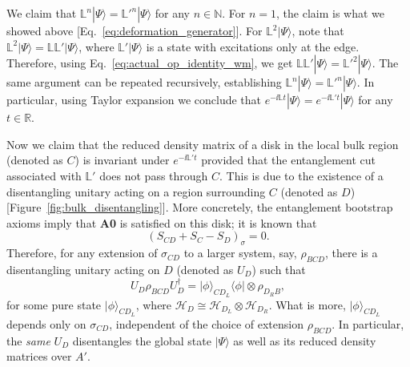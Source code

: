 \documentclass[12pt, nofootinbib]{article}
\theoremstyle{plain}
\theoremstyle{assumption}
\theoremstyle{definition}
\theoremstyle{plain}
\theoremstyle{plain}
\theoremstyle{plain}
\theoremstyle{plain}
\theoremstyle{plain}
\begin{document}
We claim that $\mathbb{L}^n|\Psi\rangle = {\mathbb{L}'}^{n}|\Psi\rangle$ for any $n\in \mathbb{N}$. For $n=1$, the claim is what we showed above  [Eq.~\eqref{eq:deformation_generator}]. For $\mathbb{L}^2 |\Psi\rangle$, note that $\mathbb{L}^2|\Psi\rangle = \mathbb{L} \mathbb{L}'|\Psi\rangle$, where $\mathbb{L}'|\Psi\rangle$ is a state with excitations only at the edge. Therefore, using Eq.~\eqref{eq:actual_op_identity_wm}, we get $\mathbb{L}\mathbb{L}' |\Psi\rangle = {\mathbb{L}'}^2|\Psi\rangle$. The same argument can be repeated recursively, establishing $\mathbb{L}^n|\Psi\rangle = {\mathbb{L}'}^n|\Psi\rangle$. In particular, using Taylor expansion we conclude that $e^{-\ii \mathbb{L} t} |\Psi\rangle = e^{-\ii \mathbb{L}' t} |\Psi\rangle$ for any $t\in \mathbb{R}$. 

Now we claim that the reduced density matrix of a disk in the local bulk region (denoted as $C$) is invariant under $e^{-\ii\mathbb{L}'t}$ provided that the entanglement cut associated with $\mathbb{L}'$ does not pass through $C$. This is due to the existence of a disentangling unitary acting on a region surrounding $C$ (denoted as $D$) [Figure~\ref{fig:bulk_disentangling}]. More concretely, the entanglement bootstrap axioms imply that \textbf{A0} is satisfied on this disk; it is known that~\cite{shi2020fusion}
\begin{equation}
    \left(S_{CD} + S_C - S_D \right)_{\sigma}=0.
\end{equation}
Therefore, for any extension of $\sigma_{CD}$ to a larger system, say, $\rho_{BCD}$, there is a disentangling unitary acting on $D$ (denoted as $U_D$) such that 
\begin{equation}
    U_D \rho_{BCD} U_D^{\dagger} = {|\phi\rangle_{CD_L}}{\langle \phi|} \otimes \rho_{D_R B},
\end{equation}
for some pure state $|\phi\rangle_{CD_L}$, where $\mathcal{H}_D \cong \mathcal{H}_{D_L}\otimes \mathcal{H}_{D_R}$. What is more, $|\phi\rangle_{CD_L}$ depends only on $\sigma_{CD}$, independent of the choice of extension $\rho_{BCD}$. In particular, the \emph{same} $U_D$ disentangles the global state $|\Psi\rangle$ as well as its reduced density matrices over $A'$. 
\end{document}
